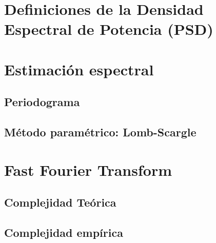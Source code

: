 \documentclass[letterpaper,11pt,oneside]{article}
\begin{document}
	





\inserttitle


\section{Definiciones de la Densidad Espectral de Potencia (PSD)}
\lipsum[1]

\newpage
\section{Estimación espectral}
\subsection{Periodograma}
\lipsum[2]

\newpage
\subsection{Método paramétrico: Lomb-Scargle}
\lipsum[3]

\newpage
\section{Fast Fourier Transform}
\subsection{Complejidad Teórica}
\lipsum[4]

\newpage
\subsection{Complejidad empírica}
\lipsum[5]

\end{document}
